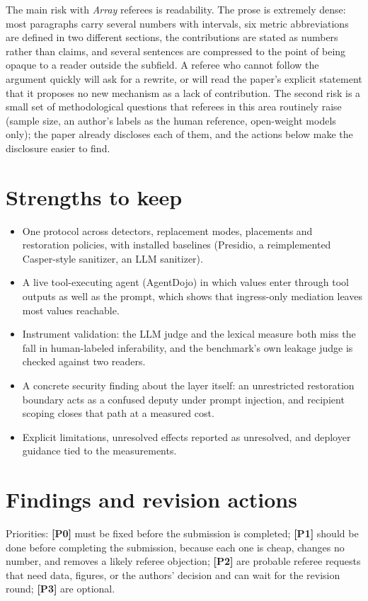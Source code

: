 \documentclass[10pt]{article}
\newcommand{\pz}{\textbf{[P0]}}
\newcommand{\po}{\textbf{[P1]}}
\newcommand{\pt}{\textbf{[P2]}}
\newcommand{\pth}{\textbf{[P3]}}
\begin{document}
The main risk with \emph{Array} referees is readability. The prose is extremely dense: most paragraphs carry several
numbers with intervals, six metric abbreviations are defined in two different sections, the contributions are stated
as numbers rather than claims, and several sentences are compressed to the point of being opaque to a reader outside
the subfield. A referee who cannot follow the argument quickly will ask for a rewrite, or will read the paper's
explicit statement that it proposes no new mechanism as a lack of contribution. The second risk is a small set of
methodological questions that referees in this area routinely raise (sample size, an author's labels as the human
reference, open-weight models only); the paper already discloses each of them, and the actions below make the
disclosure easier to find.

\section{Strengths to keep}
\begin{itemize}
\item One protocol across detectors, replacement modes, placements and restoration policies, with installed
baselines (Presidio, a reimplemented Casper-style sanitizer, an LLM sanitizer).
\item A live tool-executing agent (AgentDojo) in which values enter through tool outputs as well as the prompt,
which shows that ingress-only mediation leaves most values reachable.
\item Instrument validation: the LLM judge and the lexical measure both miss the fall in human-labeled
inferability, and the benchmark's own leakage judge is checked against two readers.
\item A concrete security finding about the layer itself: an unrestricted restoration boundary acts as a confused
deputy under prompt injection, and recipient scoping closes that path at a measured cost.
\item Explicit limitations, unresolved effects reported as unresolved, and deployer guidance tied to the
measurements.
\end{itemize}

\section{Findings and revision actions}
Priorities: \pz{} must be fixed before the submission is completed; \po{} should be done before completing the
submission, because each one is cheap, changes no number, and removes a likely referee objection; \pt{} are probable
referee requests that need data, figures, or the authors' decision and can wait for the revision round; \pth{} are
optional.
\end{document}
